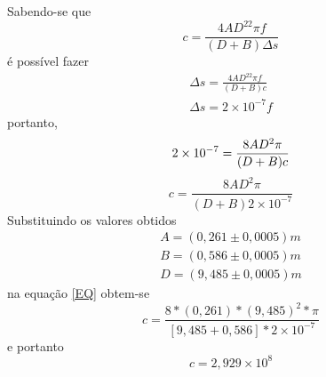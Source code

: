 Sabendo-se que
\begin{equation}
	c = \frac{4AD^22\pi f}{(D+B)\Delta s}
\end{equation}
é possível fazer
\begin{equation}
\begin{split}
	\Delta s = \frac{4AD^22\pi f}{(D+B)c}\\
	\Delta s = 2\times10^{-7}f
\end{split}
\end{equation}
portanto,
\begin{equation}
	2\times10^{-7}=\frac{8AD^2\pi}{(D+B)c}\\
\end{equation}
\begin{equation}
	c=\frac{8AD^2\pi}{(D+B)2\times10^{-7}}
\label{EQ}
\end{equation}
Substituindo os valores obtidos
\begin{equation}
	\begin{split}
		A = (0,261\pm0,0005)m\\
		B = (0,586\pm0,0005)m\\
		D = (9,485\pm0,0005)m
	\end{split}
\end{equation}
na equação \ref{EQ} obtem-se
\begin{equation}
	c=\frac{8*(0,261)*(9,485)^2*\pi}{[9,485+0,586]*2\times10^{-7}}
\end{equation}
e portanto
\begin{equation}
	c=2,929\times10^{8}
\end{equation}
